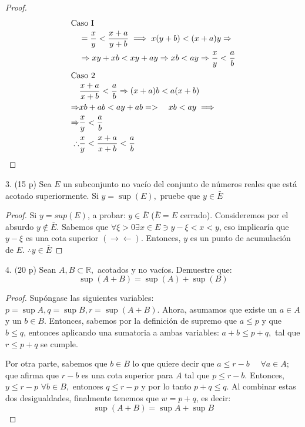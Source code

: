 \documentclass[a4paper,12pt]{article}
\begin{document}
\begin{proof}
\begin{align}
\intertext{Caso I}
&=\frac{x}{y}<\frac{x+a}{y+b}\implies x(y+b)<(x+a) y \Rightarrow \\
& \Rightarrow x y+x b<x y+a y \Rightarrow x b<a y \Rightarrow \frac{x}{y}<\frac{a}{b} \\
\intertext{Caso 2}
& \frac{x+a}{x+b}<\frac{a}{b} \Rightarrow(x+a) b<a(x+b) \\
\Rightarrow & x b+a b<a y+a b=>\quad x b<a y\implies \\
\Rightarrow & \frac{x}{y}<\frac{a}{b} \\
\therefore & \frac{x}{y}<\frac{x+a}{x+b}<\frac{a}{b}
\end{align}
\end{proof}
3. (15 p) Sea $E$ un subconjunto no vacío del conjunto de números reales que está acotado superiormente. Si $y=\sup (E),$ pruebe que $y \in \bar{E}$

\begin{proof}
Si $y=sup(E)$, a probar: $y\in\overline{E}$ ($\overline{E}= E$ cerrado). Consideremos por el absurdo $y\not\in \overline{E}$. Sabemos que $\forall \xi>0\exists  x \in E\ni y-\xi <x<y$, eso implicaría que $y-\xi$ es una cota superior $(\to\gets)$. Entonces, $y$ es un punto de acumulación de $E$. $\therefore y\in\overline{E}$
\end{proof}
4. $(20$ p) Sean $A, B \subset \mathbb{R},$ acotados y no vacíos. Demuestre que:
$$
\sup (A+B)=\sup (A)+\sup (B)
$$

\begin{proof}
Supóngase las siguientes variables: $p=\sup A, q=\sup B, r=\sup (A+B).$ Ahora, asumamos que existe un $a \in A$ y un $b \in B$. Entonces, sabemos por la definición de supremo que $a\leq p$ y que $b\leq q$, entonces aplicando una sumatoria a ambas variables: $a+b \leq p+q,$ tal que  $r \leq p+q$ se cumple.\newline

Por otra parte, sabemos que $b \in B$ lo que quiere decir que $a \leq r-b$ $\quad \forall a \in A$; que afirma que $r-b$ es una cota superior para $A$ tal que $p \leq r-b .$ Entonces, $y \leq r-p$ $\forall b \in B,$ entonces $q \leq r-p$ y por lo tanto $p+q \leq q .$ Al combinar estas dos desigualdades, finalmente tenemos que $w=p+q$, es decir: $$\sup (A+B)= \sup A+\sup B$$
\end{proof}
\end{document}
